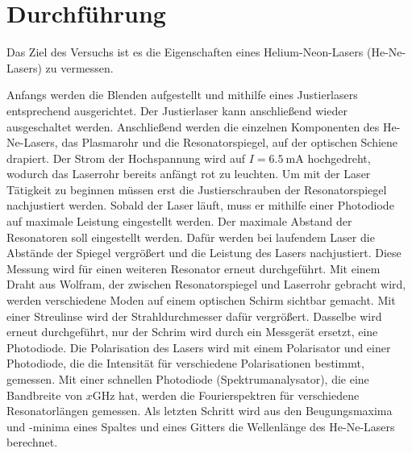 \section{Durchführung}
\label{sec:Durchführung}

Das Ziel des Versuchs ist es die Eigenschaften eines Helium-Neon-Lasers (He-Ne-Lasers) zu vermessen. 

Anfangs werden die Blenden aufgestellt und mithilfe eines Justierlasers entsprechend ausgerichtet. Der Justierlaser kann anschließend wieder ausgeschaltet werden. 
Anschließend werden die einzelnen Komponenten des He-Ne-Lasers, das Plasmarohr und die Resonatorspiegel, auf der optischen Schiene drapiert. 
Der Strom der Hochspannung wird auf $ I = \SI{6.5}{\milli\ampere}$ hochgedreht, wodurch das Laserrohr bereits anfängt rot zu leuchten.
Um mit der Laser Tätigkeit zu beginnen müssen erst die Justierschrauben der Resonatorspiegel nachjustiert werden. 
Sobald der Laser läuft, muss er mithilfe einer Photodiode auf maximale Leistung eingestellt werden.
Der maximale Abstand der Resonatoren soll eingestellt werden. Dafür werden bei laufendem Laser die Abstände der Spiegel vergrößert und die Leistung des Lasers nachjustiert. 
Diese Messung wird für einen weiteren Resonator erneut durchgeführt. 
Mit einem Draht aus Wolfram, der zwischen Resonatorspiegel und Laserrohr gebracht wird, werden verschiedene Moden auf einem optischen Schirm sichtbar gemacht. Mit einer Streulinse wird der Strahldurchmesser dafür vergrößert. 
Dasselbe wird erneut durchgeführt, nur der Schrim wird durch ein Messgerät ersetzt, eine Photodiode. 
Die Polarisation des Lasers wird mit einem Polarisator und einer Photodiode, die die Intensität für verschiedene Polarisationen bestimmt, gemessen. 
Mit einer schnellen Photodiode (Spektrumanalysator), die eine Bandbreite von $x \si{\giga\hertz}$ hat, werden die Fourierspektren für verschiedene Resonatorlängen gemessen. 
Als letzten Schritt wird aus den Beugungsmaxima und -minima eines Spaltes und eines Gitters die Wellenlänge des He-Ne-Lasers berechnet.


